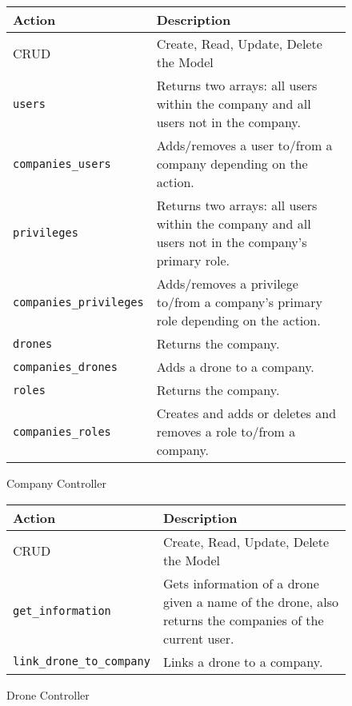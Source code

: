 \begin{figure}[htb]
\begin{center}
\begin{tabular}{ | l | p{8cm} | }
  \hline
    \textbf{Action} & \textbf{Description} \\ \hline
    CRUD & Create, Read, Update, Delete the Model \\ \hline
    \verb+users+ & Returns two arrays: all users within the company and all users not in the company.\\ \hline
    \verb+companies_users+ & Adds/removes a user to/from a company depending on the action.\\ \hline
    \verb+privileges+ & Returns two arrays: all users within the company and all users not in the company's primary role.\\ \hline
    \verb+companies_privileges+ & Adds/removes a privilege to/from a company's primary role depending on the action.\\ \hline
    \verb+drones+ & Returns the company.\\ \hline
    \verb+companies_drones+ & Adds a drone to a company.\\ \hline
    \verb+roles+ & Returns the company.\\ \hline
    \verb+companies_roles+ & Creates and adds or deletes and removes a role to/from a company.\\ \hline
\end{tabular}
\caption{Company Controller}
\label{tab:company_controller_actions}
\end{center}
\end{figure}

\begin{figure}[htb]
\begin{center}
\begin{tabular}{ | l | p{8cm} | }
  \hline
    \textbf{Action} & \textbf{Description} \\ \hline
    CRUD & Create, Read, Update, Delete the Model \\ \hline
    \verb+get_information+ & Gets information of a drone given a name of the drone, also returns the companies of the current user.\\ \hline
    \verb+link_drone_to_company+ & Links a drone to a company.\\ \hline
\end{tabular}
\caption{Drone Controller}
\label{tab:drone_controller_actions}
\end{center}
\end{figure}

